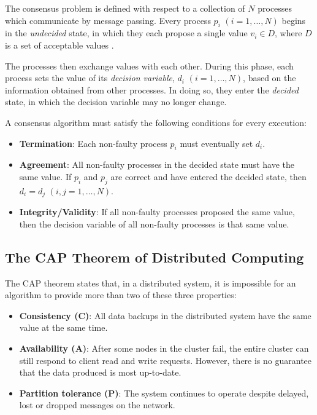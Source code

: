 \documentclass[12pt, a4paper]{article}
\begin{document}
The consensus problem is defined with respect to a collection of $N$ processes which communicate by message passing. Every process $p_{i}$ $(i = 1, \ldots, N)$ begins in the \textit{undecided} state, in which they each propose a single value $v_{i} \in D$, where $D$ is a set of acceptable values \cite{coulouris2005distributed}.

The processes then exchange values with each other. During this phase, each process sets the value of its \textit{decision variable}, $d_i$ $(i = 1, \ldots, N)$, based on the information obtained from other processes. In doing so, they enter the \textit{decided} state, in which the decision variable may no longer change.

A consensus algorithm must satisfy the following conditions for every execution:

\begin{itemize}
  \item \textbf{Termination}: Each non-faulty process $p_i$ must eventually set
    $d_i$.
  \item \textbf{Agreement}: All non-faulty processes in the decided state
    must have the same value. If $p_{i}$ and $p_{j}$ are correct and have
    entered the decided state, then $d_{i} = d_{j}$ $(i, j = 1, \ldots, N)$.
  \item \textbf{Integrity/Validity}: If all non-faulty processes proposed
    the same value, then the decision variable of all non-faulty processes is
    that same value.
\end{itemize}

\subsection{The CAP Theorem of Distributed Computing} \label{sec:cap-theorem}
The CAP theorem \cite{brewer2012cap} states that, in a distributed system, it is impossible for an algorithm to provide more than two of these three properties:

\begin{itemize}
	\item \textbf{Consistency (C)}: All data backups in the distributed system have
    the same value at the same time.
	\item \textbf{Availability (A)}: After some nodes in the cluster fail, the entire
    cluster can still respond to client read and write requests. However, there
    is no guarantee that the data produced is most up-to-date.
	\item \textbf{Partition tolerance (P)}: The system continues to operate despite
    delayed, lost or dropped messages on the network.
\end{itemize}
\end{document}
